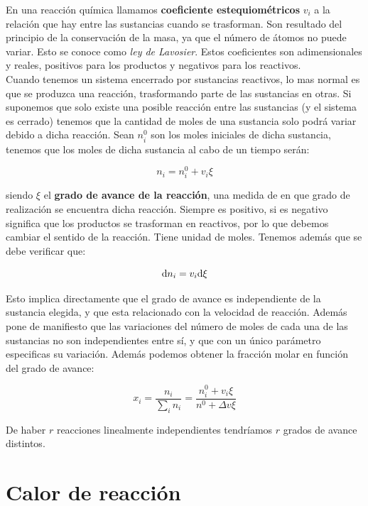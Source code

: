 \documentclass[12pt,a4paper,oneside]{book}
\begin{document}
En una reacción química llamamos \textbf{coeficiente estequiométricos} $v_i$ a la relación que hay entre las sustancias cuando se trasforman. Son resultado del principio de la conservación de la masa, ya que el número de átomos no puede variar. Esto se conoce como \textit{ley de Lavosier}. Estos coeficientes son adimensionales y reales, positivos para los productos y negativos para los reactivos. \\

Cuando tenemos un sistema encerrado por sustancias reactivos, lo mas normal es que se produzca una reacción, trasformando parte de las sustancias en otras. Si suponemos que solo existe una posible reacción entre las sustancias (y el sistema es cerrado) tenemos que la cantidad de moles de una sustancia solo podrá variar debido a dicha reacción. Sean $n_i^0$ son los moles iniciales de dicha sustancia, tenemos que los moles de dicha sustancia al cabo de un tiempo serán:

\begin{equation}
n_i = n_i^0 + v_i \xi 
\end{equation}

siendo $\xi$ el \textbf{grado de avance de la reacción}, una medida de en que grado de realización se encuentra dicha reacción. Siempre es positivo, si es negativo significa que los productos se trasforman en reactivos, por lo que debemos cambiar el sentido de la reacción. Tiene unidad de moles. Tenemos además que se debe verificar que:

\begin{equation}
\mathrm{d} n_i = v_i \mathrm{d} \xi
\end{equation}


Esto implica directamente que el grado de avance es independiente de la sustancia elegida, y que esta relacionado con la velocidad de reacción. Además pone de manifiesto que las variaciones del número de moles de cada una de las sustancias no son independientes entre sí, y que con un único parámetro especificas su variación. Además podemos obtener la fracción molar en función del grado de avance:

\begin{equation}
x_i = \dfrac{n_i}{\sum_i n_i} = \dfrac{n_i^0 + v_i \xi }{n^0 + \Delta v \xi}
\end{equation}

De haber $r$ reacciones linealmente independientes tendríamos $r$ grados de avance distintos.

\section{Calor de reacción}
\end{document}
